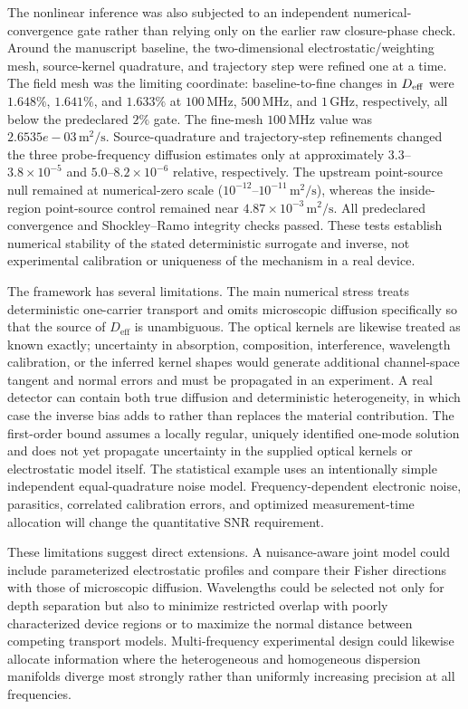 \documentclass[aps,pra,twocolumn,superscriptaddress,nofootinbib]{revtex4-2}
\newcommand{\Deff}{D_{\mathrm{eff}}}
\begin{document}
The nonlinear inference was also subjected to an independent numerical-convergence gate rather than relying only on the earlier raw closure-phase check.  Around the manuscript baseline, the two-dimensional electrostatic/weighting mesh, source-kernel quadrature, and trajectory step were refined one at a time.  The field mesh was the limiting coordinate: baseline-to-fine changes in $D_{\rm eff}$ were $1.648\%$, $1.641\%$, and $1.633\%$ at $100\,\mathrm{MHz}$, $500\,\mathrm{MHz}$, and $1\,\mathrm{GHz}$, respectively, all below the predeclared $2\%$ gate.  The fine-mesh $100\,\mathrm{MHz}$ value was $2.6535e-03\,\mathrm{m^2/s}$.  Source-quadrature and trajectory-step refinements changed the three probe-frequency diffusion estimates only at approximately $3.3$--$3.8\times10^{-5}$ and $5.0$--$8.2\times10^{-6}$ relative, respectively.  The upstream point-source null remained at numerical-zero scale ($10^{-12}$--$10^{-11}\,\mathrm{m^2/s}$), whereas the inside-region point-source control remained near $4.87\times10^{-3}\,\mathrm{m^2/s}$.  All predeclared convergence and Shockley--Ramo integrity checks passed.  These tests establish numerical stability of the stated deterministic surrogate and inverse, not experimental calibration or uniqueness of the mechanism in a real device.

The framework has several limitations. The main numerical stress treats deterministic one-carrier transport and omits microscopic diffusion specifically so that the source of $\Deff$ is unambiguous.  The optical kernels are likewise treated as known exactly; uncertainty in absorption, composition, interference, wavelength calibration, or the inferred kernel shapes would generate additional channel-space tangent and normal errors and must be propagated in an experiment. A real detector can contain both true diffusion and deterministic heterogeneity, in which case the inverse bias adds to rather than replaces the material contribution. The first-order bound assumes a locally regular, uniquely identified one-mode solution and does not yet propagate uncertainty in the supplied optical kernels or electrostatic model itself. The statistical example uses an intentionally simple independent equal-quadrature noise model. Frequency-dependent electronic noise, parasitics, correlated calibration errors, and optimized measurement-time allocation will change the quantitative SNR requirement.

These limitations suggest direct extensions. A nuisance-aware joint model could include parameterized electrostatic profiles and compare their Fisher directions with those of microscopic diffusion. Wavelengths could be selected not only for depth separation but also to minimize restricted overlap with poorly characterized device regions or to maximize the normal distance between competing transport models. Multi-frequency experimental design could likewise allocate information where the heterogeneous and homogeneous dispersion manifolds diverge most strongly rather than uniformly increasing precision at all frequencies.
\end{document}
